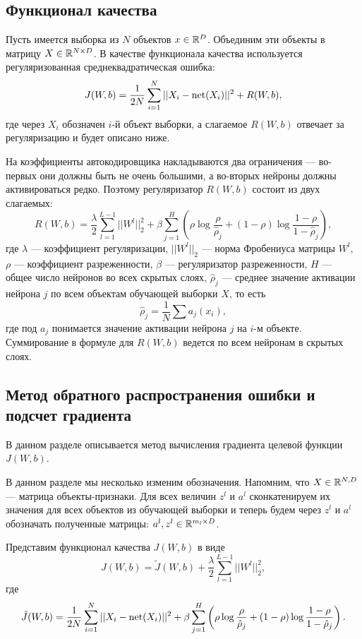 \documentclass[12pt]{article}
\begin{document}
	\subsection{Функционал качества}
		\hspace{0.6cm}Пусть имеется выборка из $N$ объектов $x \in \mathbb{R}^D$. Объединим эти объекты в матрицу $X \in \mathbb{R}^{N \times D}$. В качестве функционала качества используется регуляризованная среднеквадратическая ошибка:
		$$J(W, b) = \frac 1 {2 N} \sum_{i=1}^{N} ||X_i - \mbox{net}(X_i)||^2 + R(W, b),$$
		где через $X_i$ обозначен $i$-й объект выборки, а слагаемое $R(W, b)$ отвечает за регуляризацию и будет описано ниже.

		На коэффициенты автокодировщика накладываются два ограничения — во-первых они должны быть не очень большими, а во-вторых нейроны должны активироваться редко. Поэтому регуляризатор $R(W, b)$ состоит из двух слагаемых:
		$$R(W, b) = \frac \lambda 2 \sum_{l=1}^{L-1} ||W^l||_2^2 + \beta \sum_{j=1}^{H} \left(\rho \log\frac{\rho}{\hat\rho_j} + (1 - \rho)\log\frac{1 - \rho}{1 - \hat \rho_j} \right),$$
		где $\lambda$ — коэффициент регуляризации, $||W^l||_2$ — норма Фробениуса матрицы $W^l$, $\rho$ — коэффициент разреженности, $\beta$ — регуляризатор разреженности,  $H$ — общее число нейронов во всех скрытых слоях, $\hat\rho_j$ — среднее значение активации нейрона $j$ по всем объектам обучающей выборки $X$, то есть
		$$\hat\rho_j = \frac 1 N \sum a_j(x_i),$$
		где под $a_j$ понимается значение активации нейрона $j$ на $i$-м объекте. Суммирование в формуле для $R(W, b)$ ведется по всем нейронам в скрытых слоях.


	\subsection{Метод обратного распространения ошибки и подсчет градиента}
		\hspace{0.6cm}В данном разделе описывается метод вычисления градиента целевой функции $J(W, b)$. 

		В данном разделе мы несколько изменим обозначения. Напомним, что $X \in \mathbb{R}^{N, D}$ — матрица объекты-признаки. Для всех величин $z^l$ и $a^l$ сконкатенируем их значения для всех объектов из обучающей выборки и теперь будем через $z^l$ и $a^l$ обозначать полученные матрицы: $a^l, z^l \in \mathbb{R}^{m_l \times D}$.

		Представим функционал качества $J(W, b)$ в виде
		$$J(W, b) = \tilde J(W, b) + \frac \lambda 2 \sum_{l=1}^{L-1} ||W^l||_2^2,$$
		где 
		$$\tilde J(W, b) = \frac 1 {2 N} \sum_{i=1}^{N} ||X_i - \mbox{net}(X_i)||^2 + \beta\sum_{j=1}^{H} \left(\rho \log\frac{\rho}{\hat\rho_j} + (1 - \rho)\log\frac{1 - \rho}{1 - \hat \rho_j} \right).$$
\end{document}
